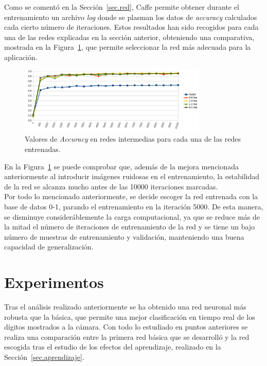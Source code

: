 Como se comentó en la Sección~\ref{sec.red}, Caffe permite obtener durante el entrenamiento un archivo \textit{log} donde se plasman los datos de \textit{accuracy} calculados cada cierto número de iteraciones. Estos resultados han sido recogidos para cada una de las redes explicadas en la sección anterior, obteniendo una comparativa, mostrada en la Figura~\ref{fig.iteraciones}, que permite seleccionar la red más adecuada para la aplicación.
\begin{figure}[H]
	\begin{center}
		\includegraphics[width=0.8\textwidth]{figures/iteraciones}
		\caption{Valores de \textit{Accuracy} en redes intermedias para cada una de las redes entrenadas.}
		\label{fig.iteraciones}
	\end{center}
\end{figure}
En la Figura~\ref{fig.iteraciones} se puede comprobar que, además de la mejora mencionada anteriormente al introducir imágenes ruidosas en el entrenamiento, la estabilidad de la red se alcanza mucho antes de las 10000 iteraciones marcadas.\\

Por todo lo mencionado anteriormente, se decide escoger la red entrenada con la base de datos 0-1, parando el entrenamiento en la iteración 5000. De esta manera, se disminuye consideráblemente la carga computacional, ya que se reduce más de la mitad el número de iteraciones de entrenamiento de la red y se tiene un bajo número de muestras de entrenamiento y validación, manteniendo una buena capacidad de generalización.

\section{Experimentos}
Tras el análisis realizado anteriormente se ha obtenido una red neuronal más robusta que la básica, que permite una mejor clasificación en tiempo real de los dígitos mostrados a la cámara. Con todo lo estudiado en puntos anteriores se realiza una comparación entre la primera red básica que se desarrolló y la red escogida tras el estudio de los efectos del aprendizaje, realizado en la Sección~\ref{sec.aprendizaje}.\\

